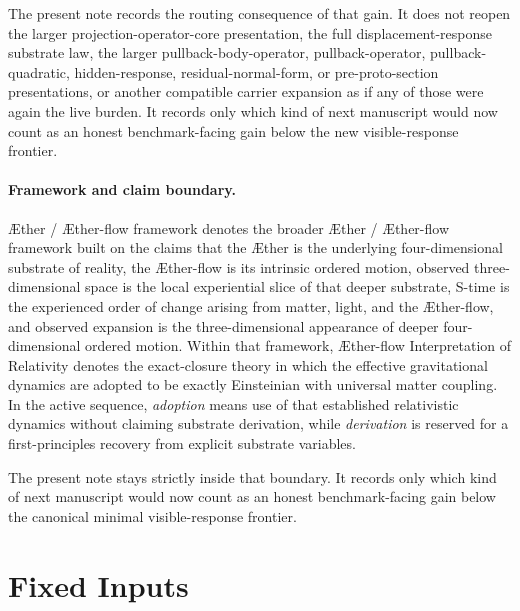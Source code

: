 \documentclass[11pt]{article}
\newcommand{\Aether}{\AE{}ther}
\newcommand{\Aflow}{\AE{}ther-flow}
\newcommand{\TheoryName}{\Aflow{} Interpretation of Relativity}
\newcommand{\TheoryProgram}{\Aether{} / \Aflow{} framework}
\begin{document}
The present note records the routing consequence of that gain. It does not reopen the larger projection-operator-core presentation, the full displacement-response substrate law, the larger pullback-body-operator, pullback-operator, pullback-quadratic, hidden-response, residual-normal-form, or pre-proto-section presentations, or another compatible carrier expansion as if any of those were again the live burden. It records only which kind of next manuscript would now count as an honest benchmark-facing gain below the new visible-response frontier.

\paragraph{Framework and claim boundary.}
\TheoryProgram{} denotes the broader \Aether{} / \Aflow{} framework built on the claims that the \Aether{} is the underlying four-dimensional substrate of reality, the \Aflow{} is its intrinsic ordered motion, observed three-dimensional space is the local experiential slice of that deeper substrate, S-time is the experienced order of change arising from matter, light, and the \Aflow{}, and observed expansion is the three-dimensional appearance of deeper four-dimensional ordered motion. Within that framework, \TheoryName{} denotes the exact-closure theory in which the effective gravitational dynamics are adopted to be exactly Einsteinian with universal matter coupling. In the active sequence, \emph{adoption} means use of that established relativistic dynamics without claiming substrate derivation, while \emph{derivation} is reserved for a first-principles recovery from explicit substrate variables.

The present note stays strictly inside that boundary. It records only which kind of next manuscript would now count as an honest benchmark-facing gain below the canonical minimal visible-response frontier.

\section{Fixed Inputs}
\end{document}
